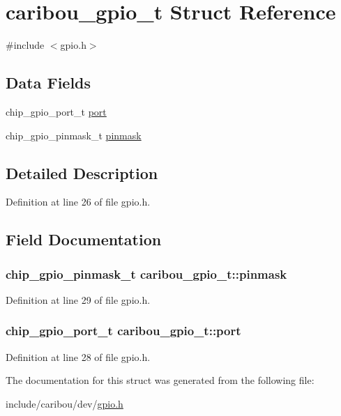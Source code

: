 \hypertarget{structcaribou__gpio__t}{\section{caribou\-\_\-gpio\-\_\-t Struct Reference}
\label{structcaribou__gpio__t}
}


{\ttfamily \#include $<$gpio.\-h$>$}

\subsection*{Data Fields}
\begin{DoxyCompactItemize}
\item 
chip\-\_\-gpio\-\_\-port\-\_\-t \hyperlink{structcaribou__gpio__t_ab474b09a256ab1cb97f704a5233f143b}{port}
\item 
chip\-\_\-gpio\-\_\-pinmask\-\_\-t \hyperlink{structcaribou__gpio__t_a176db98ba5783d4842ffd1b475d5bae2}{pinmask}
\end{DoxyCompactItemize}


\subsection{Detailed Description}


Definition at line 26 of file gpio.\-h.



\subsection{Field Documentation}
\hypertarget{structcaribou__gpio__t_a176db98ba5783d4842ffd1b475d5bae2}{
\subsubsection[{pinmask}]{\setlength{\rightskip}{0pt plus 5cm}chip\-\_\-gpio\-\_\-pinmask\-\_\-t caribou\-\_\-gpio\-\_\-t\-::pinmask}}\label{structcaribou__gpio__t_a176db98ba5783d4842ffd1b475d5bae2}


Definition at line 29 of file gpio.\-h.

\hypertarget{structcaribou__gpio__t_ab474b09a256ab1cb97f704a5233f143b}{
\subsubsection[{port}]{\setlength{\rightskip}{0pt plus 5cm}chip\-\_\-gpio\-\_\-port\-\_\-t caribou\-\_\-gpio\-\_\-t\-::port}}\label{structcaribou__gpio__t_ab474b09a256ab1cb97f704a5233f143b}


Definition at line 28 of file gpio.\-h.



The documentation for this struct was generated from the following file\-:\begin{DoxyCompactItemize}
\item 
include/caribou/dev/\hyperlink{gpio_8h}{gpio.\-h}\end{DoxyCompactItemize}
